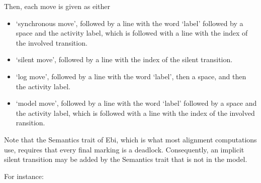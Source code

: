 {    Then, each move is given as either 
    \begin{itemize}
        \item `synchronous move', followed by a line with the word `label' followed by a space and the activity label, which is followed with a line with the index of the involved transition.
        \item `silent move', followed by a line with the index of the silent transition.
        \item `log move', followed by a line with the word `label', then a space, and then the activity label.
        \item `model move', followed by a line with the word `label' followed by a space and the activity label, which is followed with a line with the index of the involved ransition.
    \end{itemize}
    Note that the Semantics trait of Ebi, which is what most alignment computations use, requires that every final marking is a deadlock.
    Consequently, an implicit silent transition may be added by the Semantics trait that is not in the model.
    
    For instance:
    
\clearpage
}
